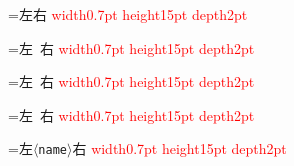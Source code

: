 \documentclass[12pt]{l3doc}
\begin{document}
\newbox\bx
\def\R#1{\setbox\bx=\hbox{#1}\copy\bx
  \textcolor{red}{\vrule width0.7pt height15pt depth2pt}}
\noindent\R{左右}\par
\noindent\R{左 \meta{name}右}\par
\noindent\R{左 右}\par
\noindent\R{左  右}\par
\noindent\R{左\texttt{$\langle$name$\rangle$}右}
\end{document}
